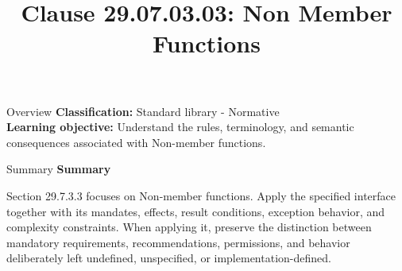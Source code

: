 \documentclass[10pt,letterpaper]{article}
\title{Clause 29.07.03.03: Non Member Functions}
\author{}
\date{}
\begin{document}
\maketitle
\begin{CornellOverviewBox}{Overview}
\textbf{Classification:} Standard library - Normative\\[2pt]
\textbf{Learning objective:} Understand the rules, terminology, and semantic consequences associated with Non-member functions.
\end{CornellOverviewBox}\begin{CornellSummaryBox}{Summary}
{\sffamily\bfseries\color{Accent} Summary}\par\vspace{3pt}Section 29.7.3.3 focuses on Non-member functions. Apply the specified interface together with its mandates, effects, result conditions, exception behavior, and complexity constraints. When applying it, preserve the distinction between mandatory requirements, recommendations, permissions, and behavior deliberately left undefined, unspecified, or implementation-defined.
\end{CornellSummaryBox}
\end{document}

